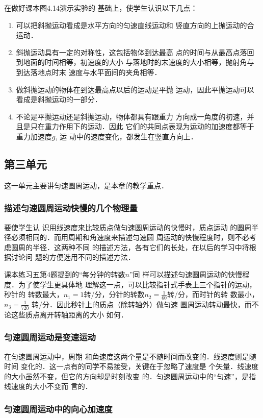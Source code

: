 在做好课本图4.14演示实验的
基础上，使学生认识以下几点：
\begin{enumerate}
\item 可以把斜抛运动看成是水平方向的匀速直线运动和
竖直方向的上抛运动的合运动．
\item 斜抛运动具有一定的对称性，这包括物体到达最高
点的时间与从最高点落回到地面的时间相等，初速度的大小
与落地时的末速度的大小相等，抛射角与到达落地点时末
速度与水平面间的夹角相等．
\item 做斜抛运动的物体在到达最高点以后的运动是平抛
运动，因此平抛运动可以看成是斜抛运动的一部分．
\item 不论是平抛运动还是斜抛运动，物体都具有跟重力
方向成一角度的初速，并且是只在重力作用下的运动．因此
它们的共同点表现为运动的加速度都等于重力加速度$g$, 运
动中的速度变化，都发生在竖直方向上．
\end{enumerate}

\subsection{第三单元}
这一单元主要讲匀速圆周运动，是本章的教学重点．
\subsubsection{描述匀速圆周运动快慢的几个物理量}
要使学生认
识用线速度来比较质点做匀速圆周运动的快慢时，质点运动
的圆周半径必须相同的．而用周期和角速度来描述匀速圆
周运动的快慢程度时，则不必考虑圆周的半径．这两种不同
的描述方法，各有它们的长处，在以后的学习中将根据讨论问
题的方便选用不同的描述方法．

课本练习五第4题提到的“每分钟的转数$n$”同
样可以描述匀速圆周运动的快慢程度．为了使学生更具体地
理解这一点，可以比较指针式手表上三个指针的运动，秒针的
转数最大，$n_1=1$转/分，分针的转数$n_2=\frac{1}{60}
$转/分，而时针的转
数最小，$n_3=\frac{1}{720}$
转/分．因此秒针上的质点（除转轴外）做匀速
圆周运动转动最快，而不论这些质点离开转轴距离的大小
如何．

\subsubsection{匀速圆周运动是变速运动}

在匀速圆周运动中，周期
和角速度这两个量是不随时间而改变的．线速度则是随时间
变化的．这一点有的同学不易接受，关键在于忽略了速度是
个矢量．线速度的大小虽然不变，但它的方向却是时刻改变
的．匀速圆周运动中的“匀速”，是指线速度的大小不变而
言的．

\subsubsection{匀速圆周运动中的向心加速度}

